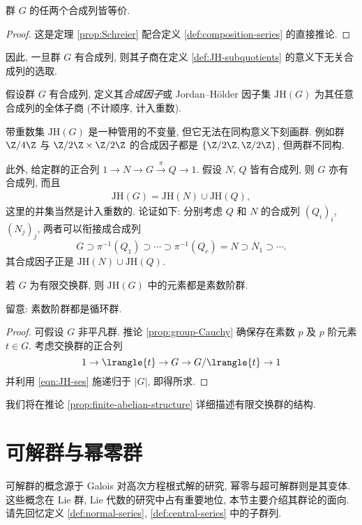 \begin{theorem}\label{prop:JH-group}
	群 $G$ 的任两个合成列皆等价.
\end{theorem}
\begin{proof}
	这是定理 \ref{prop:Schreier} 配合定义 \ref{def:composition-series} 的直接推论.
\end{proof}

因此, 一旦群 $G$ 有合成列, 则其子商在定义 \ref{def:JH-subquotients} 的意义下无关合成列的选取.
\begin{definition}
	假设群 $G$ 有合成列, 定义其\emph{合成因子}或 Jordan--Hölder 因子集 $\text{JH}(G)$ 为其任意合成列的全体子商 (不计顺序, 计入重数).
\end{definition}

带重数集 $\text{JH}(G)$ 是一种管用的不变量, 但它无法在同构意义下刻画群. 例如群 $\Z/4\Z$ 与 $\Z/2\Z \times \Z/2\Z$ 的合成因子都是 $\{ \Z/2\Z, \Z/2\Z\}$, 但两群不同构.

此外, 给定群的正合列 $1 \to N \to G \xrightarrow{\pi} Q \to 1$. 假设 $N$, $Q$ 皆有合成列, 则 $G$ 亦有合成列, 而且
\begin{gather}\label{eqn:JH-ses}
	\text{JH}(G) = \text{JH}(N) \cup  \text{JH}(Q),
\end{gather}
这里的并集当然是计入重数的. 论证如下: 分别考虑 $Q$ 和 $N$ 的合成列 $(Q_i)_i$, $(N_j)_j$, 两者可以衔接成合成列
\[ G \supset \pi^{-1}(Q_1) \supset \cdots \supset \pi^{-1}(Q_r) = N \supset N_1 \supset \cdots . \]
其合成因子正是 $\text{JH}(N) \cup  \text{JH}(Q)$.

\begin{proposition}\label{prop:abelian-composition-series}
	若 $G$ 为有限交换群, 则 $\text{JH}(G)$ 中的元素都是素数阶群.
\end{proposition}
留意: 素数阶群都是循环群.
\begin{proof}
	可假设 $G$ 非平凡群. 推论 \ref{prop:group-Cauchy} 确保存在素数 $p$ 及 $p$ 阶元素 $t \in G$. 考虑交换群的正合列
	\[ 1 \to \lrangle{t} \to G \to G/\lrangle{t} \to 1 \]
	并利用 \eqref{eqn:JH-ses} 施递归于 $|G|$, 即得所求.
\end{proof}

我们将在推论 \ref{prop:finite-abelian-structure} 详细描述有限交换群的结构.

\section{可解群与幂零群}\label{sec:solvable-groups}
可解群的概念源于 Galois 对高次方程根式解的研究, 幂零与超可解群则是其变体. 这些概念在 Lie 群, Lie 代数的研究中占有重要地位, 本节主要介绍其群论的面向. 请先回忆定义 \ref{def:normal-series}, \ref{def:central-series} 中的子群列.

